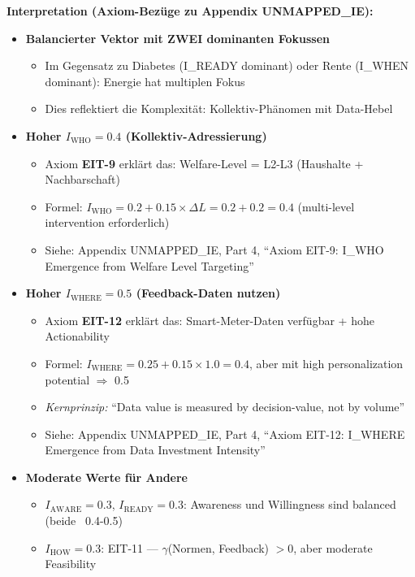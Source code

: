 \textbf{Interpretation (Axiom-Bezüge zu Appendix UNMAPPED_IE):}
\begin{itemize}[nosep]
\item \textbf{Balancierter Vektor mit ZWEI dominanten Fokussen}
  \begin{itemize}[nosep]
  \item Im Gegensatz zu Diabetes (I_READY dominant) oder Rente (I_WHEN dominant): Energie hat multiplen Fokus
  \item Dies reflektiert die Komplexität: Kollektiv-Phänomen mit Data-Hebel
  \end{itemize}

\item \textbf{Hoher $I_{\text{WHO}} = 0.4$ (Kollektiv-Adressierung)}
  \begin{itemize}[nosep]
  \item Axiom \textbf{EIT-9} erklärt das: Welfare-Level = L2-L3 (Haushalte + Nachbarschaft)
  \item Formel: $I_{\text{WHO}} = 0.2 + 0.15 \times \Delta L = 0.2 + 0.2 = 0.4$ (multi-level intervention erforderlich)
  \item Siehe: Appendix UNMAPPED_IE, Part 4, ``Axiom EIT-9: I_WHO Emergence from Welfare Level Targeting''
  \end{itemize}

\item \textbf{Hoher $I_{\text{WHERE}} = 0.5$ (Feedback-Daten nutzen)}
  \begin{itemize}[nosep]
  \item Axiom \textbf{EIT-12} erklärt das: Smart-Meter-Daten verfügbar + hohe Actionability
  \item Formel: $I_{\text{WHERE}} = 0.25 + 0.15 \times 1.0 = 0.4$, aber mit high personalization potential $\Rightarrow$ 0.5
  \item \textit{Kernprinzip:} ``Data value is measured by decision-value, not by volume''
  \item Siehe: Appendix UNMAPPED_IE, Part 4, ``Axiom EIT-12: I_WHERE Emergence from Data Investment Intensity''
  \end{itemize}

\item \textbf{Moderate Werte für Andere}
  \begin{itemize}[nosep]
  \item $I_{\text{AWARE}} = 0.3$, $I_{\text{READY}} = 0.3$: Awareness und Willingness sind balanced (beide ~0.4-0.5)
  \item $I_{\text{HOW}} = 0.3$: EIT-11 --- $\gamma$(Normen, Feedback) $> 0$, aber moderate Feasibility
  \end{itemize}
\end{itemize}


